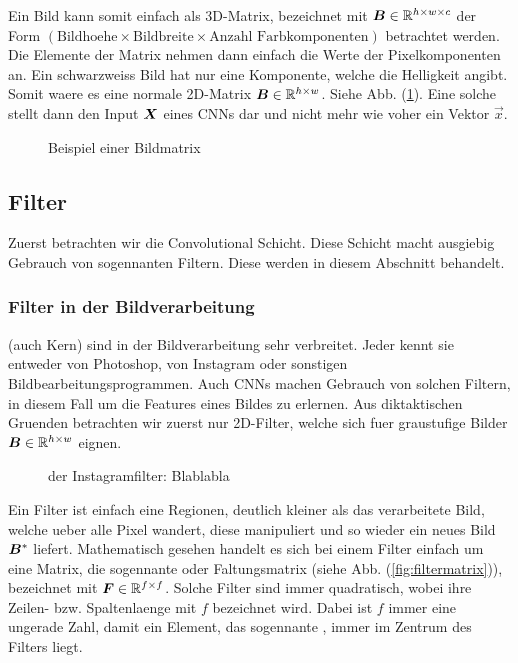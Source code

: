 \para{}
Ein Bild kann somit einfach als 3D-Matrix, bezeichnet mit $\mat{B} \in \set{R}^{h \times w
  \times c}$ der Form $(\text{Bildhoehe} \times
\text{Bildbreite} \times \text{Anzahl Farbkomponenten})$ betrachtet werden. Die
Elemente der Matrix nehmen dann einfach die Werte der Pixelkomponenten an.
Ein schwarzweiss Bild hat nur eine Komponente, welche die Helligkeit angibt.
Somit waere es eine normale 2D-Matrix $\mat{B} \in \set{R}^{h \times w}$.
Siehe Abb. (\ref{fig:bildmatrix}).
\para{}
Eine solche  stellt dann den Input $\mat{X}$ eines CNNs dar und nicht mehr wie
voher ein Vektor $\vec{x}$.


\begin{figure}[h!]
  \begin{tikzpicture}

  \end{tikzpicture}
  \caption{Beispiel einer Bildmatrix}
  \label{fig:bildmatrix}
\end{figure}

\subsection{Filter}
Zuerst betrachten wir die Convolutional Schicht. Diese Schicht macht ausgiebig
Gebrauch von sogennanten Filtern. Diese werden in diesem Abschnitt behandelt.
\subsubsection{Filter in der Bildverarbeitung}
 (auch Kern) sind in der Bildverarbeitung sehr verbreitet. Jeder kennt sie entweder
von Photoshop, von Instagram oder sonstigen Bildbearbeitungsprogrammen.
Auch CNNs machen Gebrauch von solchen Filtern, in diesem Fall um die Features eines Bildes zu
erlernen. Aus diktaktischen Gruenden betrachten wir zuerst nur 2D-Filter, welche sich fuer graustufige
Bilder $\mat{B} \in \set{R}^{h \times w}$ eignen.
\begin{figure}[h!]

  \caption{der Instagramfilter: Blablabla}
\end{figure}

\para{}
Ein Filter ist einfach eine Regionen, deutlich kleiner als das verarbeitete Bild, welche
ueber alle Pixel wandert, diese manipuliert und so wieder ein neues Bild
$\mat{B}^*$ liefert.
Mathematisch gesehen handelt es sich bei einem Filter einfach um eine Matrix,
die sogennante  oder Faltungsmatrix (siehe Abb. (\ref{fig:filtermatrix})),
bezeichnet mit $\mat{F} \in \set{R}^{f \times f}$. Solche Filter sind immer quadratisch,
wobei ihre Zeilen- bzw. Spaltenlaenge mit $f$ bezeichnet wird. Dabei ist $f$
immer eine ungerade Zahl, damit ein Element, das sogennante , immer im Zentrum des Filters liegt.

